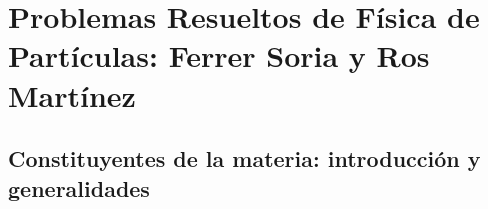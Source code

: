 
\chapter{Problemas Resueltos de Física de Partículas: Ferrer Soria y Ros Martínez}
\label{chap:problemas_particulas_ferrer_soria}

\section{Constituyentes de la materia: introducción y generalidades}



